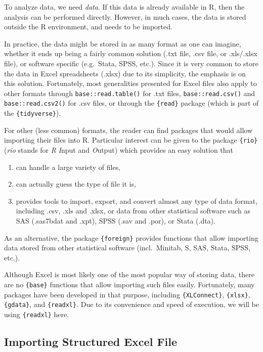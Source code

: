\documentclass[
]{book}
\providecommand{\tightlist}{%
  \setlength{\itemsep}{0pt}\setlength{\parskip}{0pt}}
\begin{document}
To analyze data, we need \emph{data}. If this data is already available in R, then the analysis can be performed directly. However, in much cases, the data is stored outside the R environment, and needs to be imported.

In practice, the data might be stored in as many format as one can imagine, whether it ends up being a fairly common solution (.txt file, .csv file, or .xls/.xlsx file), or software specific (e.g.~Stata, SPSS, etc.).
Since it is very common to store the data in Excel spreadsheets (.xlsx) due to its simplicity, the emphasis is on this solution. Fortunately, most generalities presented for Excel files also apply to other formats through \texttt{base::read.table()} for .txt files, \texttt{base::read.csv()} and \texttt{base::read.csv2()} for .csv files, or through the \texttt{\{read\}} package (which is part of the \texttt{\{tidyverse\}}).

For other (less common) formats, the reader can find packages that would allow importing their files into R. Particular interest can be given to the package \texttt{\{rio\}} (\emph{rio} stands for \emph{R} \emph{I}nput and \emph{O}utput) which provides an easy solution that

\begin{enumerate}
\def\labelenumi{\arabic{enumi}.}
\tightlist
\item
  can handle a large variety of files,
\item
  can actually guess the type of file it is,
\item
  provides tools to import, export, and convert almost any type of data format, including .csv, .xls and .xlsx, or data from other statistical software such as SAS (.sas7bdat and .xpt), SPSS (.sav and .por), or Stata (.dta).
\end{enumerate}

As an alternative, the package \texttt{\{foreign\}} provides functions that allow importing data stored from other statistical software (incl.~Minitab, S, SAS, Stata, SPSS, etc.).

Although Excel is most likely one of the most popular way of storing data, there are no \texttt{\{base\}} functions that allow importing such files easily. Fortunately, many packages have been developed in that purpose, including \texttt{\{XLConnect\}}, \texttt{\{xlsx\}}, \texttt{\{gdata\}}, and \texttt{\{readxl\}}. Due to its convenience and speed of execution, we will be using \texttt{\{readxl\}} here.

\hypertarget{importing-structured-excel-file}{%
\subsection{Importing Structured Excel File}\label{importing-structured-excel-file}}
\end{document}
